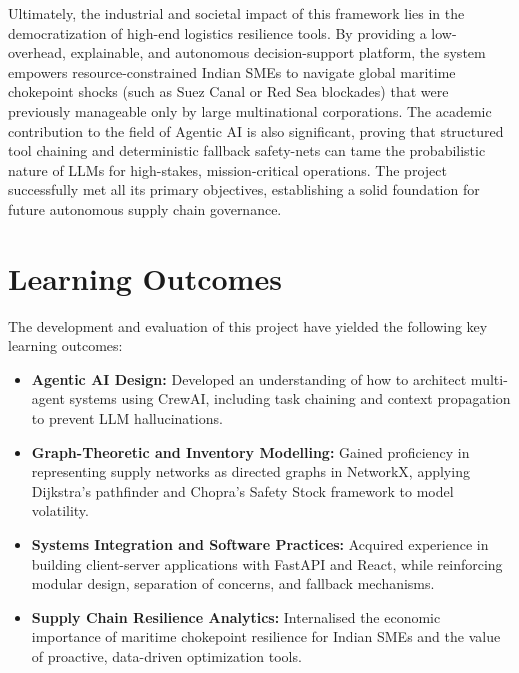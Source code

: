 Ultimately, the industrial and societal impact of this framework lies in the democratization of high-end logistics resilience tools. By providing a low-overhead, explainable, and autonomous decision-support platform, the system empowers resource-constrained Indian SMEs to navigate global maritime chokepoint shocks (such as Suez Canal or Red Sea blockades) that were previously manageable only by large multinational corporations. The academic contribution to the field of Agentic AI is also significant, proving that structured tool chaining and deterministic fallback safety-nets can tame the probabilistic nature of LLMs for high-stakes, mission-critical operations. The project successfully met all its primary objectives, establishing a solid foundation for future autonomous supply chain governance.

\section[Learning Outcomes]{Learning Outcomes}
The development and evaluation of this project have yielded the following key learning outcomes:

\begin{itemize}
    \item \textbf{Agentic AI Design:} Developed an understanding of how to architect multi-agent systems using CrewAI, including task chaining and context propagation to prevent LLM hallucinations.
    \item \textbf{Graph-Theoretic and Inventory Modelling:} Gained proficiency in representing supply networks as directed graphs in NetworkX, applying Dijkstra's pathfinder and Chopra's Safety Stock framework to model volatility.
    \item \textbf{Systems Integration and Software Practices:} Acquired experience in building client-server applications with FastAPI and React, while reinforcing modular design, separation of concerns, and fallback mechanisms.
    \item \textbf{Supply Chain Resilience Analytics:} Internalised the economic importance of maritime chokepoint resilience for Indian SMEs and the value of proactive, data-driven optimization tools.
\end{itemize}

